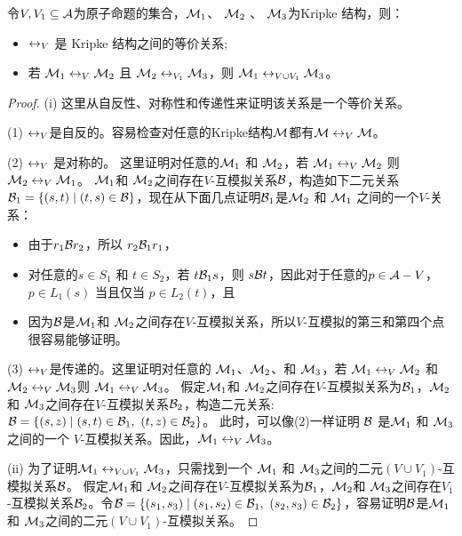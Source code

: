 \begin{proposition} \label{pro:EqUnion}
	令$V, V_1 \subseteq {\cal A}$为原子命题的集合，${\cal M}_1$、 ${\cal M}_2$ 、 ${\cal M}_3$为Kripke 结构，则：
	\begin{itemize} 
		\item[(i)] $\leftrightarrow_V$ 是 Kripke 结构之间的等价关系;
		\item[(ii)] 若 ${\cal M}_1 \leftrightarrow_V {\cal M}_2$ 且 ${\cal M}_2 \leftrightarrow_{V_1} {\cal M}_3$，则 ${\cal M}_1 \leftrightarrow_{V \cup V_1} {\cal M}_3$。
	\end{itemize}
	
\end{proposition}
\begin{proof}
	(i) 这里从自反性、对称性和传递性来证明该关系是一个等价关系。
	
	(1) $\leftrightarrow_V$是自反的。容易检查对任意的Kripke结构${\cal M}$都有${\cal M}\leftrightarrow_V {\cal M}$。
	
	(2) $\leftrightarrow_V$ 是对称的。 这里证明对任意的${\cal M}_1$ 和 ${\cal M}_2$，若 ${\cal M}_1 \leftrightarrow_V {\cal M}_2$ 则 ${\cal M}_2 \leftrightarrow_V {\cal M}_1$。
	${\cal M}_1$和 ${\cal M}_2$之间存在$V$-互模拟关系${\cal B}$，构造如下二元关系${\cal B}_1=\{(s,t) \mid (t, s)\in {\cal B}\}$，现在从下面几点证明${\cal B}_1$是${\cal M}_2$ 和 ${\cal M}_1$ 之间的一个$V$-关系：
	\begin{itemize}
		\item 由于$r_1 {\cal B} r_2$，所以 $r_2 {\cal B}_1 r_1$，
		\item 对任意的$s\in S_1$ 和 $t\in S_2$，若 $t {\cal B}_1 s$，则 $s{\cal B} t$，因此对于任意的$p \in {\cal A} - V$，$p \in L_1(s)$ 当且仅当 $p \in L_2(t)$，且
		\item 因为${\cal B}$是${\cal M}_1$和 ${\cal M}_2$之间存在$V$-互模拟关系，所以$V$-互模拟的第三和第四个点很容易能够证明。
	\end{itemize}
	
	(3) $\leftrightarrow_V$是传递的。这里证明对任意的 ${\cal M}_1$、${\cal M}_2$、和 ${\cal M}_3$，若 ${\cal M}_1 \leftrightarrow_V {\cal M}_2$ 和 ${\cal M}_2 \leftrightarrow_V {\cal M}_3$则 ${\cal M}_1 \leftrightarrow_V {\cal M}_3$。 假定${\cal M}_1$和 ${\cal M}_2$之间存在$V$-互模拟关系为${\cal B}_1$，${\cal M}_2$和 ${\cal M}_3$之间存在$V$-互模拟关系${\cal B}_2$，构造二元关系: ${\cal B}=\{(s, z) \mid (s,t) \in {\cal B}_1,\ (t, z)\in {\cal B}_2\}$。
	此时，可以像(2)一样证明 ${\cal B}$ 是${\cal M}_1$ 和 ${\cal M}_3$之间的一个 $V$-互模拟关系。因此，${\cal M}_1 \leftrightarrow_V {\cal M}_3$。
	
	(ii) 为了证明${\cal M}_1 \leftrightarrow_{V\cup V_1} {\cal M}_3$，只需找到一个  ${\cal M}_1$ 和 ${\cal M}_3$之间的二元$(V\cup V_1)$-互模拟关系${\cal B}$。
	假定${\cal M}_1$和 ${\cal M}_2$之间存在$V$-互模拟关系为${\cal B}_1$，${\cal M}_2$和 ${\cal M}_3$之间存在$V_1$-互模拟关系${\cal B}_2$。令${\cal B} = \{(s_1, s_3)\mid (s_1, s_2) \in {\cal B}_1, \ (s_2, s_3) \in {\cal B}_2\}$，容易证明${\cal B}$是${\cal M}_1$ 和 ${\cal M}_3$之间的二元$(V\cup V_1)$-互模拟关系。
\end{proof}

